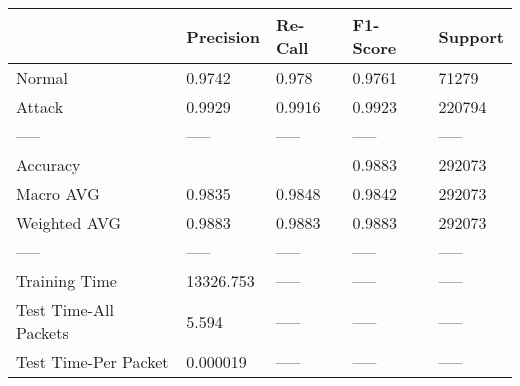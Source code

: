 \begin{tabular}{lllll}
\toprule
{} &  Precision & Re-Call & F1-Score & Support \\
\midrule
Normal                &     0.9742 &   0.978 &   0.9761 &   71279 \\
Attack                &     0.9929 &  0.9916 &   0.9923 &  220794 \\
-----                 &      ----- &   ----- &    ----- &   ----- \\
Accuracy              &            &         &   0.9883 &  292073 \\
Macro AVG             &     0.9835 &  0.9848 &   0.9842 &  292073 \\
Weighted AVG          &     0.9883 &  0.9883 &   0.9883 &  292073 \\
-----                 &      ----- &   ----- &    ----- &   ----- \\
Training Time         &  13326.753 &   ----- &    ----- &   ----- \\
Test Time-All Packets &      5.594 &   ----- &    ----- &   ----- \\
Test Time-Per Packet  &   0.000019 &   ----- &    ----- &   ----- \\
\bottomrule
\end{tabular}
